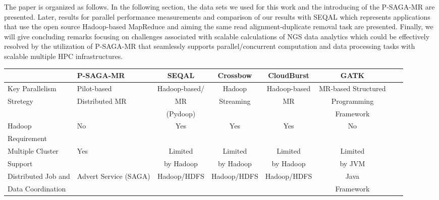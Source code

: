 \documentclass{sig-alternate}
\begin{document}
The paper is organized as follows. In the following section, the data sets we used for this work and the introducing of the P-SAGA-MR are presented.   Later, results for parallel performance measurements and comparison of our results with SEQAL which represents applications that use the open source Hadoop-based MapReduce\cite{hadoop-url, taylor2010} and aiming the same read alignment-duplicate removal task\cite{seal_2011_mapred,seal2011} are presented.  Finally, we will give concluding remarks focusing on challenges associated with scalable calculations of NGS data analytics which could be effectively resolved by the utilization of P-SAGA-MR that seamlessly supports parallel/concurrent computation and data processing  tasks with scalable multiple HPC infrastructures.

\begin{center}
\begin{table}[ht]
{\small
\hfill{}
\begin{tabular}{|l|l|c|c|c|c|c|c|}
\hline
  & \textbf{P-SAGA-MR}\cite{pmr2012} & \textbf{SEQAL}\cite{seal2011} & \textbf{Crossbow}\cite{langmead2009} & \textbf{CloudBurst}\cite{cloudburst} & \textbf{GATK}\cite{gatk} \\ \hline
 \hline 
Key Parallelism   & Pilot-based   &  Hadoop-based/  &  Hadoop   & Hadoop-based & MR-based Structured \\ 
Stretegy  & Distributed MR & MR  & Streaming  & MR & Programming  \\
& & (Pydoop) &  & & Framework  \\ \hline
  
Hadoop & No & Yes & Yes\footnote[1] & Yes & No \\ 
Requirement  & & & &  &\\ \hline  
  
    
Multiple  Cluster & Yes  & Limited   & Limited  & Limited  & Limited \\
Support &  & by Hadoop &  by Hadoop & by Hadoop  & by JVM   \\ \hline

Distributed Job and  & Advert Service (SAGA) & Hadoop/HDFS & Hadoop/HDFS & Hadoop/HDFS & Java \\ 
Data Coordination & &  & & & Framework\\ \hline
%


\end{tabular}}
\end{table}
\end{center}
\end{document}

